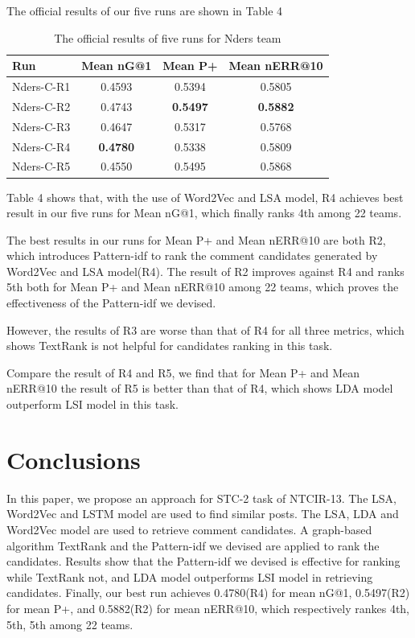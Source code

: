 \documentclass{sig-alternate}
\begin{document}
The official results of our five runs are shown in Table 4
\begin{table}
\centering
\caption{The official results of five runs for Nders team}
\label{tab:commands}
\begin{minipage}{\columnwidth}
\begin{center}
\begin{tabular}{|l|c|c|c|}
\hline
 Run        &  Mean nG@1  &  Mean P+  &  Mean nERR@10  \\ \hline
 Nders-C-R1 & 0.4593 & 0.5394 & 0.5805 \\ \hline
 Nders-C-R2 & 0.4743 & \textbf{0.5497} & \textbf{0.5882} \\ \hline
 Nders-C-R3 & 0.4647 & 0.5317 & 0.5768 \\ \hline
 Nders-C-R4 & \textbf{0.4780} & 0.5338 & 0.5809 \\ \hline
 Nders-C-R5 & 0.4550 & 0.5495 & 0.5868 \\ \hline
\end{tabular}
\end{center}
\end{minipage}
\end{table}

Table 4 shows that, with the use of Word2Vec and LSA model, R4 achieves 
best result in our five runs for Mean nG@1, which finally ranks 4th among 22 
teams. 

The best results in our runs for Mean P+ and Mean nERR@10 are both R2, 
which introduces Pattern-idf to rank the comment candidates generated by 
Word2Vec and LSA model(R4). The result of R2 improves against R4 and ranks 5th 
both for Mean P+ and Mean nERR@10 among 22 teams, which proves the 
effectiveness of the Pattern-idf we devised. 

However, the results of R3 are worse than that of R4 for all three metrics, 
which shows TextRank is not helpful for candidates ranking in this task.

Compare the result of R4 and R5, we find that for Mean P+ and Mean nERR@10 the 
result of R5 is better than that of R4, which shows LDA model outperform LSI 
model in this task.

\section{Conclusions}
In this paper, we propose an approach for STC-2 task of NTCIR-13. The LSA,
Word2Vec and LSTM model are used to find similar posts. The LSA, LDA and Word2Vec 
model are used to retrieve comment candidates. A graph-based algorithm TextRank 
and the Pattern-idf we devised are applied to rank the candidates. Results show 
that the Pattern-idf we devised is effective for ranking while TextRank not, 
and LDA model outperforms LSI model in retrieving candidates. Finally, our best 
run achieves 0.4780(R4) for mean nG@1, 0.5497(R2) for mean P+, and 0.5882(R2) for 
mean nERR@10, which respectively rankes 4th, 5th, 5th among 22 teams. 
\end{document}

